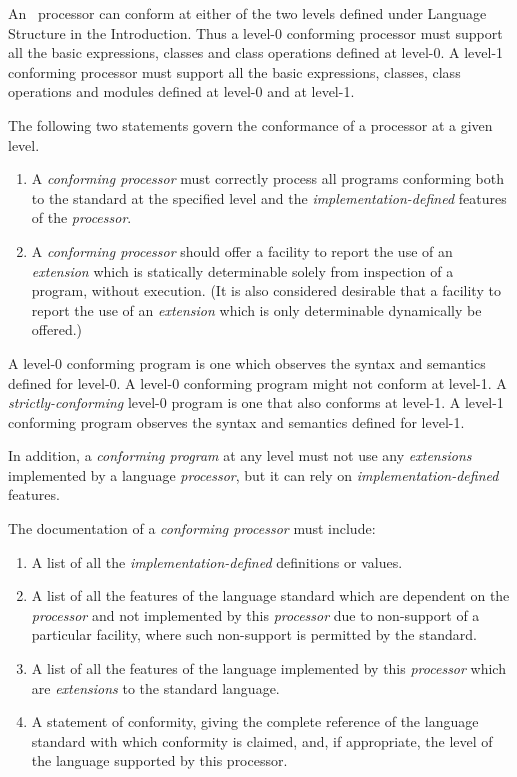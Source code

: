 %
\begin{optDefinition}
An \eulisp\ processor can conform at either of the
two levels defined under Language Structure in the Introduction.
Thus a level-0 conforming processor
must support all the basic expressions, classes and class operations
defined at level-0.  A level-1
conforming processor must support all the basic expressions, classes,
class operations and modules defined at level-0 and at level-1.

The following two statements govern the conformance of a processor at a given
level.
\begin{enumerate}
    \item A {\em conforming processor\/} must correctly process all programs
    conforming both to the standard at the specified level and the {\em
        implementation-defined} features of the {\em processor}.
    \item A {\em conforming processor\/} should offer a facility to report the
    use of an {\em extension} which is statically determinable solely from
    inspection of a program, without execution.  (It is also considered
    desirable that a facility to report the use of an {\em extension} which is
    only determinable dynamically be offered.)
\end{enumerate}
%
A level-0 conforming program is one which
observes the syntax and semantics defined for level-0.  A level-0 conforming
program might not conform at level-1.  A {\em strictly-conforming\/} level-0
program is one that also conforms at level-1.  A level-1 conforming program
observes the syntax and semantics defined for level-1.

In addition, a {\em conforming program\/} at any level must not use any {\em
    extensions\/} implemented by a language {\em processor\/}, but it can rely
on {\em implementation-defined\/} features.

\noindent
The documentation of a {\em conforming processor\/} must include:
\begin{enumerate}
    \item A list of all the {\em implementation-defined\/} definitions or
    values.
    \item A list of all the features of the language standard which are
    dependent on the {\em processor\/} and not implemented by this {\em
        processor\/} due to non-support of a particular facility, where such
    non-support is permitted by the standard.
    \item A list of all the features of the language implemented by this {\em
        processor\/} which are {\em extensions\/} to the standard language.
    \item A statement of conformity, giving the complete reference of the
    language standard with which conformity is claimed, and, if appropriate, the
    level of the language supported by this processor.
\end{enumerate}
\end{optDefinition}
